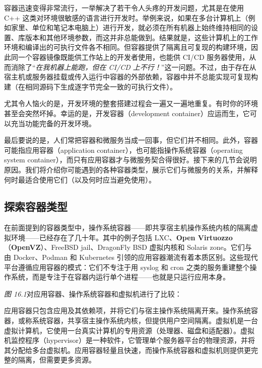 \label{idx:1713}
容器迅速变得非常流行，一举解决了若干令人头疼的开发问题，尤其是在使用 C++ 这类对环境很敏感的语言进行开发时。举例来说，如果在多台计算机上（例如家里、单位和笔记本电脑上）进行开发，就必须在所有机器上始终维持相同的设置、库版本和其他环境参数，而这并非总能做到。结果就是，这些计算机上的工作环境和编译出的可执行文件各不相同。但容器提供了隔离且可复现的构建环境，因此同一个容器镜像既能供工作站上的开发者使用，也能供 CI/CD 服务器使用，从而消除了“\emph{在我机器上能跑，但在 CI/CD 上不行！}”这一问题。不过，由于存在从宿主机或服务器挂载或传入运行中容器的外部依赖，容器中并不总能实现可复现构建（在相同源码下生成逐字节完全一致的可执行文件）。

尤其令人恼火的是，开发环境的整套搭建过程会一遍又一遍地重复。有时你的环境甚至会突然坏掉。幸运的是，开发容器（development container）应运而生，它可以充当功能完备的开发环境。

最后要说的是，人们常把容器和微服务当成一回事，但它们并不相同。此外，容器可能指应用容器（application container），也可能指操作系统容器（operating system container），而只有应用容器才与微服务契合得很好。接下来的几节会说明原因。我们将介绍你可能遇到的各种容器类型，展示它们与微服务的关系，并解释何时最适合使用它们（以及何时应当避免使用）。

\subsection{探索容器类型}

\label{idx:1714}
\label{idx:1715}
在前面提到的容器类型中，操作系统容器——即共享宿主机操作系统内核的隔离虚拟环境——已经存在了几十年。其中的例子包括 LXC、\textbf{Open Virtuozzo}（\textbf{OpenVZ}）、FreeBSD jail、DragonFly BSD 虚拟内核和 Solaris zone。它们与由 Docker、Podman 和 Kubernetes 引领的应用容器潮流有着本质区别。这些现代平台遵循应用容器的模式：它们不专注于用 syslog 和 cron 之类的服务重建整个操作系统，而是专注于在容器内运行单个进程——也就是只运行应用本身。

\emph{图 16.1}对应用容器、操作系统容器和虚拟机进行了比较：


\label{idx:1716}
应用容器只包含应用及其依赖项，并将它们与宿主操作系统隔离开来。操作系统容器，或称系统容器，共享宿主操作系统内核，但提供用户空间隔离。虚拟机是一台虚拟计算机，它使用一台真实计算机的专用资源（处理器、磁盘和适配器）。虚拟机监控程序（hypervisor）是一种软件，它管理单个服务器平台的物理资源，并将其分配给多台虚拟机。应用容器轻量且快速，而操作系统容器和虚拟机则提供更完整的隔离，但需要更多资源。

